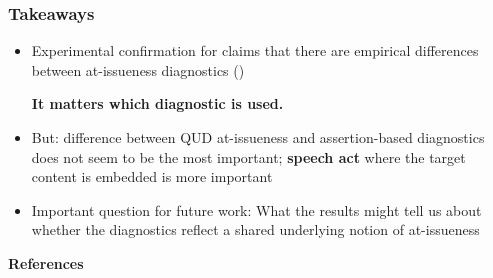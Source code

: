 \documentclass[compress, xcolor = dvipsnames, aspectratio=169]{beamer}
\begin{document}
	\begin{frame}\frametitle{Takeaways}
	
		\begin{itemize}[<+->]
			\item Experimental confirmation for claims that there are empirical differences between at-issueness diagnostics (\citealt{snider_anaphoric_2017,snider_at-issuenessne_2017,snider_distinguishing_2018,koev_notions_2018,faller_discourse_2019,korotkova_evidential_2020})
			\begin{center}
				\textbf{It matters which diagnostic is used.}\bigskip
			\end{center}


			\item But: difference between QUD at-issueness and assertion-based diagnostics does not seem to be the most important; \textbf{speech act} where the target content is embedded is more important \medskip


			\item Important question for future work: What the results might tell us about whether the diagnostics reflect a shared underlying notion of at-issueness
		\end{itemize}

	
	\end{frame}



\begin{frame}[allowframebreaks]{\bfseries\opt References}
	\footnotesize
	
	

\end{frame}
\end{document}
